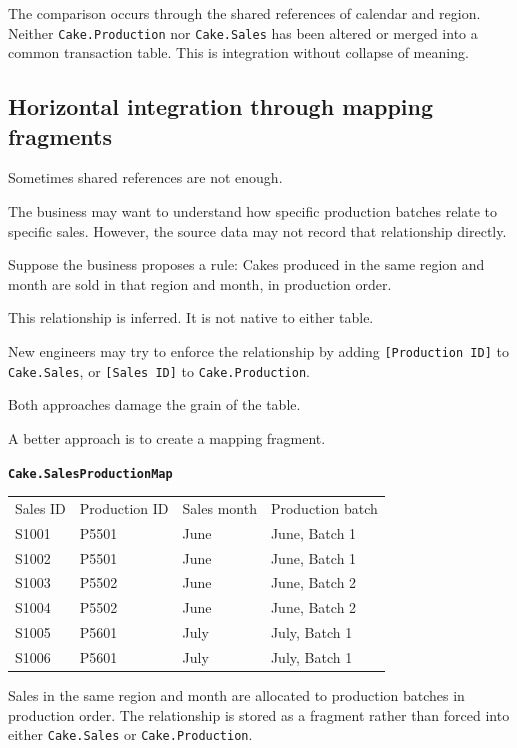 \documentclass[10pt,openany,10pt]{book}
\newcounter{none}
\let\podeToprule\toprule
\let\podeMidrule\midrule
\let\podeBottomrule\bottomrule
\renewcommand{\toprule}{\arrayrulecolor{pbiGrid}\podeToprule}
\renewcommand{\midrule}{\arrayrulecolor{pbiGrid}\podeMidrule}
\renewcommand{\bottomrule}{\arrayrulecolor{pbiGrid}\podeBottomrule}
\begin{document}
The comparison occurs through the shared references of calendar and
region. Neither \texttt{Cake.Production} nor \texttt{Cake.Sales} has
been altered or merged into a common transaction table. This is
integration without collapse of meaning.

\subsection{Horizontal integration through mapping
fragments}\label{horizontal-integration-through-mapping-fragments}

Sometimes shared references are not enough.

The business may want to understand how specific production batches
relate to specific sales. However, the source data may not record that
relationship directly.

Suppose the business proposes a rule: Cakes produced in the same region
and month are sold in that region and month, in production order.

This relationship is inferred. It is not native to either table.

New engineers may try to enforce the relationship by adding
\texttt{{[}Production\ ID{]}} to \texttt{Cake.Sales}, or
\texttt{{[}Sales\ ID{]}} to \texttt{Cake.Production}.

Both approaches damage the grain of the table.

A better approach is to create a mapping fragment.

\textbf{\texttt{Cake.SalesProductionMap}}

{\def\LTcaptype{none} %
\begin{longtable}[]{@{}llll@{}}
\toprule\noalign{}
Sales ID & Production ID & Sales month & Production batch \\
\midrule\noalign{}
\endhead
\bottomrule\noalign{}
\endlastfoot
S1001 & P5501 & June & June, Batch 1 \\
S1002 & P5501 & June & June, Batch 1 \\
S1003 & P5502 & June & June, Batch 2 \\
S1004 & P5502 & June & June, Batch 2 \\
S1005 & P5601 & July & July, Batch 1 \\
S1006 & P5601 & July & July, Batch 1 \\
\end{longtable}
}

Sales in the same region and month are allocated to production batches
in production order. The relationship is stored as a fragment rather
than forced into either \texttt{Cake.Sales} or \texttt{Cake.Production}.
\end{document}
